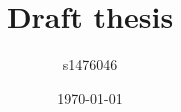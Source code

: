 \documentclass{book}
\title{Draft thesis}
\author{s1476046 }
\date{\today}
\begin{document}
\frontmatter
\maketitle
\tableofcontents

\listoftodos

\mainmatter

%


%
%



%



%
%
%

%


%
\printbibliography
\backmatter


\end{document}
